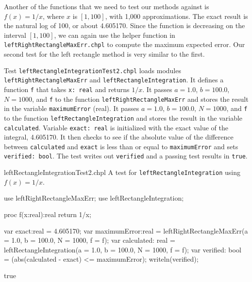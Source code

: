 Another of the functions that we need to test our methods against is 
$f(x) = 1/x$, where $x$ is $[1,100]$, with 1,000 approximations. 
The exact result is the natural log of 100, or about 4.605170.
Since the function is decreasing on the interval $[1,100]$, we can again use 
the helper function in \lstinline{leftRightRectangleMaxErr.chpl} to compute the 
maximum expected error.  
Our second test 
for the left rectangle method is very similar to the first. 
\begin{enumspec}
\item{}
  Test \lstinline{leftRectangleIntegrationTest2.chpl} loads modules
  \lstinline{leftRightRectangleMaxErr} and
  \lstinline{leftRectangleIntegration}.
  It defines a function \lstinline{f} that takes \lstinline{x: real} and returns $1/x$.
  It passes $a=1.0$, $b=100.0$, $N=1000$, and \lstinline{f} to the function
  \lstinline{leftRightRectangleMaxErr} and stores the result in the variable
  \lstinline{maximumError} (real).
  It passes $a=1.0$, $b=100.0$, $N=1000$, and \lstinline{f} to the function
  \lstinline{leftRectangleIntegration} and stores the result in the variable
  \lstinline{calculated}.
  Variable \lstinline{exact: real} is initialized with the exact value of the integral, 4.605170.
  It then checks to see if the absolute value of the difference between \lstinline{calculated} 
  and \lstinline{exact} is less than or equal to \lstinline{maximumError} and sets 
  \lstinline{verified: bool}. The test writes out \lstinline{verified} and a passing
  test results in \lstinline{true}.
\end{enumspec}

\begin{chapelexample}{leftRectangleIntegrationTest2.chpl}
  A test for \lstinline{leftRectangleIntegration} using $f(x) = 1/x$.
  \begin{chapelpre}
  \end{chapelpre}
  \begin{chapel}
    use leftRightRectangleMaxErr;
    use leftRectangleIntegration;

    proc f(x:real):real {
      return 1/x;
    } 

    var exact:real = 4.605170; 
    var maximumError:real = leftRightRectangleMaxErr(a = 1.0, b = 100.0, N = 1000, f = f);
    var calculated: real = leftRectangleIntegration(a = 1.0, b = 100.0, N = 1000, f = f);
    var verified: bool = (abs(calculated - exact) <= maximumError);
    writeln(verified);
  \end{chapel}
  \begin{chapelpost}
  \end{chapelpost}
  \begin{chapeloutput}
true
  \end{chapeloutput}
\end{chapelexample}

